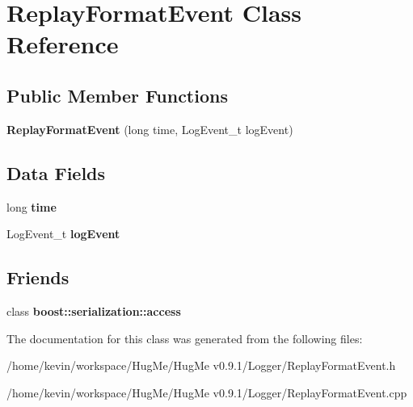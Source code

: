 \hypertarget{classReplayFormatEvent}{
\section{ReplayFormatEvent Class Reference}
\label{classReplayFormatEvent}
}
\subsection*{Public Member Functions}
\begin{DoxyCompactItemize}
\item 
\hypertarget{classReplayFormatEvent_aefd3a06940ae986aa9c3c2b6886cf5c2}{
{\bfseries ReplayFormatEvent} (long time, LogEvent\_\-t logEvent)}
\label{classReplayFormatEvent_aefd3a06940ae986aa9c3c2b6886cf5c2}

\end{DoxyCompactItemize}
\subsection*{Data Fields}
\begin{DoxyCompactItemize}
\item 
\hypertarget{classReplayFormatEvent_a8752c98de9f608ef9794efca7f08bdb9}{
long {\bfseries time}}
\label{classReplayFormatEvent_a8752c98de9f608ef9794efca7f08bdb9}

\item 
\hypertarget{classReplayFormatEvent_ad5f6fcaac9f58026e5a87a1320666236}{
LogEvent\_\-t {\bfseries logEvent}}
\label{classReplayFormatEvent_ad5f6fcaac9f58026e5a87a1320666236}

\end{DoxyCompactItemize}
\subsection*{Friends}
\begin{DoxyCompactItemize}
\item 
\hypertarget{classReplayFormatEvent_ac98d07dd8f7b70e16ccb9a01abf56b9c}{
class {\bfseries boost::serialization::access}}
\label{classReplayFormatEvent_ac98d07dd8f7b70e16ccb9a01abf56b9c}

\end{DoxyCompactItemize}


The documentation for this class was generated from the following files:\begin{DoxyCompactItemize}
\item 
/home/kevin/workspace/HugMe/HugMe v0.9.1/Logger/ReplayFormatEvent.h\item 
/home/kevin/workspace/HugMe/HugMe v0.9.1/Logger/ReplayFormatEvent.cpp\end{DoxyCompactItemize}
